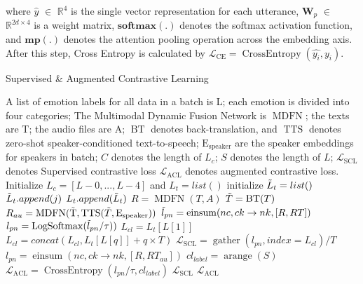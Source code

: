 \documentclass{INTERSPEECH2023}
\begin{document}
where $\hat{y}$ $\in$ $\mathbb{R}^{4}$ is the single vector representation for each utterance, $\mathbf{W}_{p}$ $\in$ $\mathbb{R}^{2d \times 4}$ is a weight matrix, $\mathbf{softmax(.)}$ denotes the softmax activation function, and $\mathbf{mp(.)}$ denotes the attention pooling operation across the embedding axis. After this step, Cross Entropy is calculated by $\mathcal{L}_{\mathrm{CE}}=\operatorname{CrossEntropy}(\hat{y_i}, y_i)$.
\vspace{1mm}

\begin{algorithm}[t]
\scriptsize
\caption{Supervised \& Augmented Contrastive Learning}\label{alg:cap}
\begin{algorithmic}
\Require A list of emotion labels for all data in a batch is L; each emotion is divided into four categories; The Multimodal Dynamic Fusion Network is $\operatorname{MDFN}$; the texts are T; the audio files are A; $\operatorname{BT}$ denotes back-translation, and $\operatorname{TTS}$ denotes zero-shot speaker-conditioned text-to-speech; $\operatorname{E_{speaker}}$ are the speaker embeddings for speakers in batch; $C$ denotes the length of $L_c$; $S$ denotes the length of $L$; $\mathcal{L}_\mathrm{SCL}$ denotes Supervised contrastive loss $\mathcal{L}_\mathrm{ACL}$ denotes augmented contrastive loss.
\State Initialize $L_c = [L - 0, ..., L - 4]$ and $L_t =
list()$
    \State initialize $\Tilde{L}_{t} = list()$
            \State $\Tilde{L}_{t}.append(j)$
        \EndIf
    \EndFor 
    \State $L_{t}.append(\Tilde{L}_{t})$
\EndFor
\State $R = \operatorname{MDFN}(T, A)$
\State $\Tilde{T} = \operatorname{BT}(T)$
\State $R_{au} = \operatorname{MDFN}(\Tilde{\operatorname{T}}, \operatorname{TTS}(\Tilde{T}, \operatorname{E_{speaker}}))$
\State $\Tilde{l}_{pn} = \operatorname{einsum}(nc, ck \rightarrow nk, [R, RT ])$
\State $l_{pn} = \operatorname{LogSoftmax}(\Tilde{l}_{pn}/ \tau))$
\State $L_{cl} = L_{t}[L[1]]$
    \State $L_{cl} = concat(L_{cl}, L_{t}[L[q]] + q × T )$
\EndFor 
\State $\mathcal{L}_\mathrm{SCL}= \operatorname{gather}(l_{pn}, index = L_{cl})/T$
\State $l_{pn} = \operatorname{einsum}(nc, ck \rightarrow nk, [R, RT_{au}])$
\State $cl_{label} = \operatorname{arange}(S)$
\State $\mathcal{L}_\mathrm{ACL} = \operatorname{CrossEntropy}(l_{pn}/ \tau, cl_{label})$
\State \Return $\mathcal{L}_\mathrm{SCL}$ $\mathcal{L}_\mathrm{ACL}$
\end{algorithmic}
\end{algorithm}
\end{document}
